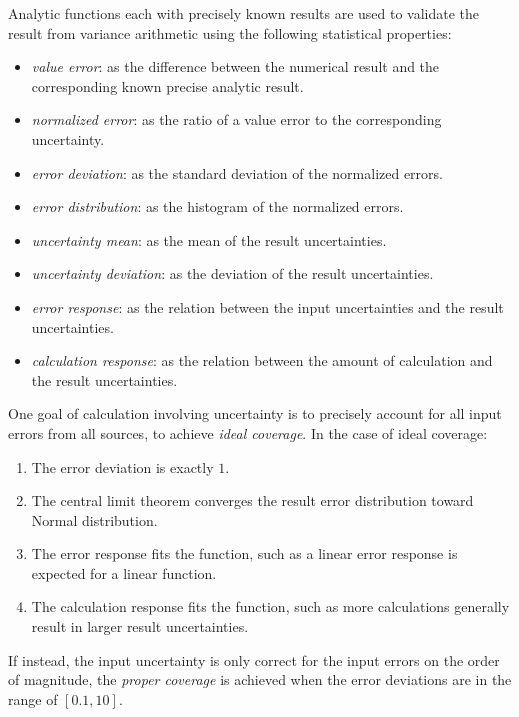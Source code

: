 \documentclass[twoside]{article}
\numberwithin{equation}{section}
\begin{document}
Analytic functions each with precisely known results are used to validate the result from variance arithmetic using the following statistical properties: 
\begin{itemize}

\item \emph{value error}: as the difference between the numerical result and the corresponding known precise analytic result.

\item \emph{normalized error}: as the ratio of a value error to the corresponding uncertainty.

\item \emph{error deviation}: as the standard deviation of the normalized errors.

\item \emph{error distribution}: as the histogram of the normalized errors.

\item \emph{uncertainty mean}: as the mean of the result uncertainties.

\item \emph{uncertainty deviation}: as the deviation of the result uncertainties.

\item \emph{error response}: as the relation between the input uncertainties and the result uncertainties.

\item \emph{calculation response}: as the relation between the amount of calculation and the result uncertainties.

\end{itemize}

One goal of calculation involving uncertainty is to precisely account for all input errors from all sources, to achieve \emph{ideal coverage}.
In the case of ideal coverage:
\begin{enumerate}
\item The error deviation is exactly $1$.

\item The central limit theorem converges the result error distribution toward Normal distribution.

\item The error response fits the function, such as a linear error response is expected for a linear function.

\item The calculation response fits the function, such as more calculations generally result in larger result uncertainties.

\end{enumerate}
If instead, the input uncertainty is only correct for the input errors on the order of magnitude, the \emph{proper coverage} is achieved when the error deviations are in the range of $[0.1, 10]$.
\end{document}
